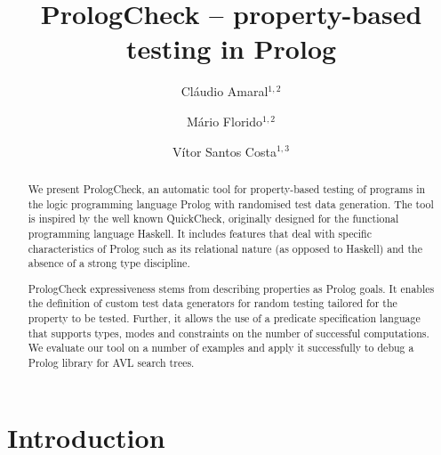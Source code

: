 \documentclass[runningheads,a4paper]{../../PaperStyles/llncs}
\newcommand{\Prolog}[0]{{\sf Prolog}}
\newcommand{\Haskell}[0]{{\sf Haskell}}
\newcommand{\QuickCheck}[0]{{\sf QuickCheck}}
\newcommand{\plqc}[0]{{\sf PrologCheck}}
\begin{document}
\newcommand{\papertitle}{{PrologCheck} -- property-based testing in {Prolog}}

\mainmatter  %

\title{\papertitle}


\author{
  Cl\'audio Amaral$^{1,2}$ \and
  M\'ario Florido$^{1,2}$ \and
  V\'itor Santos Costa$^{1,3}$
}



\maketitle
\begin{abstract}


We present \plqc{}, an automatic tool for property-based
testing of programs in the logic programming language \Prolog{} with
randomised test data generation.
%
The tool is inspired by the well known \QuickCheck, originally designed
for the functional programming language \Haskell{}. It includes features
that deal with specific characteristics of \Prolog{} such as its
relational nature (as opposed to \Haskell{}) and the absence of a strong
type discipline.


\plqc{} expressiveness stems from describing properties as
\Prolog{} goals.
%
It enables the definition of custom test data generators for
random testing tailored for the property to be tested.
%
Further, it allows the use of a predicate specification language that
supports types, modes and constraints on the number of successful
computations.
%
We evaluate our tool on a number of  examples and apply
it successfully to debug a \Prolog{} library for AVL search trees.

\end{abstract}




\section{Introduction}
\label{sec:intro}
\end{document}
